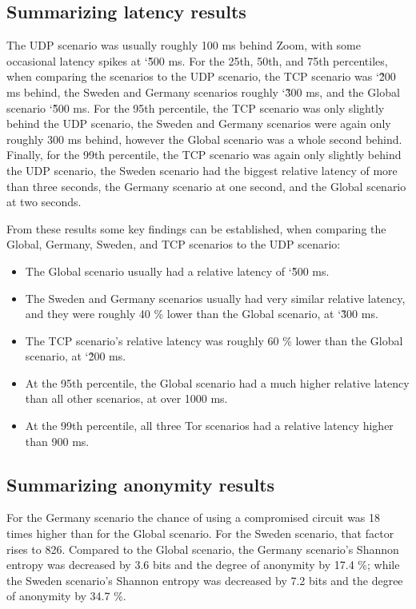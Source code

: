 \documentclass{kththesis}
\begin{document}
\subsection{Summarizing latency results}
The UDP scenario was usually roughly 100 ms behind Zoom, with some occasional latency spikes at \char`\~500 ms. For the 25th, 50th, and 75th percentiles, when comparing the scenarios to the UDP scenario, the TCP scenario was \char`\~200 ms behind, the Sweden and Germany scenarios roughly \char`\~300 ms, and the Global scenario \char`\~500 ms. For the 95th percentile, the TCP scenario was only slightly behind the UDP scenario, the Sweden and Germany scenarios were again only roughly 300 ms behind, however the Global scenario was a whole second behind. Finally, for the 99th percentile, the TCP scenario was again only slightly behind the UDP scenario, the Sweden scenario had the biggest relative latency of more than three seconds, the Germany scenario at one second, and the Global scenario at two seconds.

\break
\noindent From these results some key findings can be established, when comparing the Global, Germany, Sweden, and TCP scenarios to the UDP scenario:

\begin{itemize}
  \vspace{-0.2cm}\item The Global scenario usually had a relative latency of \char`\~500 ms.
  \vspace{-0.2cm}\item The Sweden and Germany scenarios usually had very similar relative latency, and they were roughly 40 \% lower than the Global scenario, at \char`\~300 ms.
  \vspace{-0.2cm}\item The TCP scenario's relative latency was roughly 60 \% lower than the Global scenario, at \char`\~200 ms.
  \vspace{-0.2cm}\item At the 95th percentile, the Global scenario had a much higher relative latency than all other scenarios, at over 1000 ms.
  \vspace{-0.2cm}\item At the 99th percentile, all three Tor scenarios had a relative latency higher than 900 ms.
\end{itemize}

\subsection{Summarizing anonymity results}
For the Germany scenario the chance of using a compromised circuit was 18 times higher than for the Global scenario. For the Sweden scenario, that factor rises to 826. Compared to the Global scenario, the Germany scenario's Shannon entropy was decreased by 3.6 bits and the degree of anonymity by 17.4 \%; while the Sweden scenario's Shannon entropy was decreased by 7.2 bits and the degree of anonymity by 34.7 \%.
\end{document}
